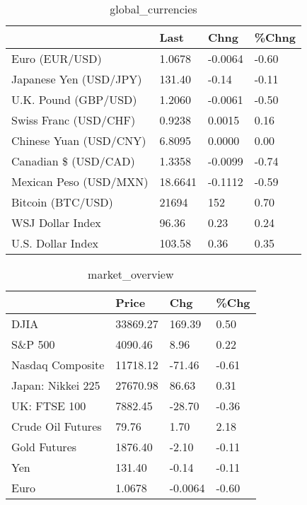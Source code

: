 \documentclass{article}%
\begin{document}
%


\begin{table}[htbp]%
\caption{global\_currencies}%
\centering%
\begin{adjustbox}{width=1\textwidth}%
\begin{tabular}{llll}
\toprule
                       &    Last &    Chng & \%Chng \\
\midrule
        Euro (EUR/USD) &  1.0678 & -0.0064 & -0.60 \\
Japanese Yen (USD/JPY) &  131.40 &   -0.14 & -0.11 \\
  U.K. Pound (GBP/USD) &  1.2060 & -0.0061 & -0.50 \\
 Swiss Franc (USD/CHF) &  0.9238 &  0.0015 &  0.16 \\
Chinese Yuan (USD/CNY) &  6.8095 &  0.0000 &  0.00 \\
  Canadian \$ (USD/CAD) &  1.3358 & -0.0099 & -0.74 \\
Mexican Peso (USD/MXN) & 18.6641 & -0.1112 & -0.59 \\
     Bitcoin (BTC/USD) &   21694 &     152 &  0.70 \\
      WSJ Dollar Index &   96.36 &    0.23 &  0.24 \\
     U.S. Dollar Index &  103.58 &    0.36 &  0.35 \\
\bottomrule
\end{tabular}
%
\end{adjustbox}%
\end{table}

%


\begin{table}[htbp]%
\caption{market\_overview}%
\centering%
\begin{adjustbox}{width=1\textwidth}%
\begin{tabular}{llll}
\toprule
                  &    Price &     Chg &  \%Chg \\
\midrule
             DJIA & 33869.27 &  169.39 &  0.50 \\
          S\&P 500 &  4090.46 &    8.96 &  0.22 \\
 Nasdaq Composite & 11718.12 &  -71.46 & -0.61 \\
Japan: Nikkei 225 & 27670.98 &   86.63 &  0.31 \\
     UK: FTSE 100 &  7882.45 &  -28.70 & -0.36 \\
Crude Oil Futures &    79.76 &    1.70 &  2.18 \\
     Gold Futures &  1876.40 &   -2.10 & -0.11 \\
              Yen &   131.40 &   -0.14 & -0.11 \\
             Euro &   1.0678 & -0.0064 & -0.60 \\
\bottomrule
\end{tabular}
%
\end{adjustbox}%
\end{table}

%
\end{document}
